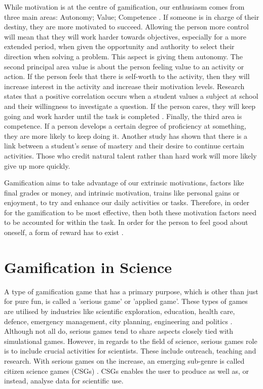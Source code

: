 		While motivation is at the centre of gamification, our enthusiasm comes from three main areas: Autonomy; Value; Competence \cite{keepmotivation}. If someone is in charge of their destiny, they are more motivated to succeed. Allowing the person more control will mean that they will work harder towards objectives, especially for a more extended period, when given the opportunity and authority to select their direction when solving a problem. This aspect is giving them autonomy. The second principal area value is about the person feeling value to an activity or action. If the person feels that there is self-worth to the activity, then they will increase interest in the activity and increase their motivation levels. Research states that a positive correlation occurs when a student values a subject at school and their willingness to investigate a question. If the person cares, they will keep going and work harder until the task is completed \cite{gamescience, keepmotivation}. Finally, the third area is competence. If a person develops a certain degree of proficiency at something, they are more likely to keep doing it. Another study has shown that there is a link between a student’s sense of mastery and their desire to continue certain activities. Those who credit natural talent rather than hard work will more likely give up more quickly.
		
		Gamification aims to take advantage of our extrinsic motivations, factors like final grades or money, and intrinsic motivation, trains like personal gains or enjoyment, to try and enhance our daily activities or tasks. Therefore, in order for the gamification to be most effective, then both these motivation factors need to be accounted for within the task. In order for the person to feel good about oneself, a form of reward has to exist \cite{gamescience}.
			
	\section{Gamification in Science}
		\label{sec:game_in_science}
	
		A type of gamification game that has a primary purpose, which is other than just for pure fun, is called a 'serious game' or 'applied game'. These types of games are utilised by industries like scientific exploration, education, health care, defence, emergency management, city planning, engineering and politics \cite{wikiserious}. Although not all do, serious games tend to share aspects closely tied with simulational games. However, in regards to the field of science, serious games role is to include crucial activities for scientists. These include outreach, teaching and research. With serious games on the increase, an emerging sub-genre is called citizen science games (CSGs) \cite{10seriousrules}. CSGs enables the user to produce as well as, or instead, analyse data for scientific use.
		
